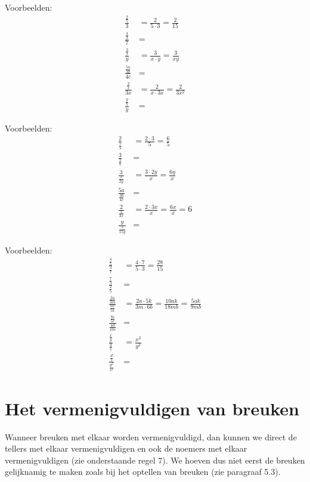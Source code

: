 
Voorbeelden:
\begin{align*}
\frac{\frac{2}{5}}{3}    &= \frac{2}{5 \cdot 3} = \frac{2}{15} \\[1em]
\frac{\frac{3}{2}}{7}    &= \\[1em]
\frac{\frac{3}{x}}{y}    &= \frac{3}{x \cdot y} = \frac{3}{xy} \\[1em]
\frac{\frac{5a}{3b}}{4c} &= \\[1em]
\frac{\frac{2}{x}}{3x}   &= \frac{2}{x \cdot 3x} = \frac{2}{3x^2} \\[1em]
\frac{\frac{y}{5}}{y}    &=
\end{align*}


Voorbeelden:
\begin{align*}
\frac{2}{\frac{5}{3}}    &= \frac{2 \cdot 3}{5} = \frac{6}{5} \\[1em]
\frac{3}{\frac{2}{7}}    &= \\[1em]
\frac{3}{\frac{x}{2y}}   &= \frac{3 \cdot 2y}{x} = \frac{6y}{x} \\[1em]
\frac{5a}{\frac{3b}{4c}} &= \\[1em]
\frac{2}{\frac{x}{3x}}   &= \frac{2 \cdot 3x}{x} = \frac{6x}{x} = 6 \\[1em]
\frac{y}{\frac{5}{15y}}  &=
\end{align*}

\newpage
{}

Voorbeelden:
\begin{align*}
\frac{\frac{4}{5}}{\frac{3}{7}}      &= \frac{4 \cdot 7}{5 \cdot 3} = \frac{28}{15} \\[1em]
\frac{\frac{7}{3}}{\frac{2}{5}}      &= \\[1em]
\frac{\frac{2a}{3m}}{\frac{6b}{5k}}  &= \frac{2a \cdot 5k}{3m \cdot 6b} = \frac{10ak}{18mb} = \frac{5ak}{9mb} \\[1em]
\frac{\frac{8c}{5r}}{\frac{4d}{10s}} &= \\[1em]
\frac{\frac{x}{y}}{\frac{y}{x}}      &= \frac{x^2}{y^2} \\[1em]
\frac{\frac{d}{s}}{\frac{d^2}{s^2}}  &=
\end{align*}

\section{Het vermenigvuldigen van breuken}
Wanneer breuken met elkaar worden vermenigvuldigd, dan kunnen we direct de tellers met elkaar vermenigvuldigen en ook de noemers met elkaar vermenigvuldigen (zie onderstaande regel 7). We hoeven dus niet eerst de breuken gelijknamig te maken zoals bij het optellen van breuken (zie paragraaf 5.3).

